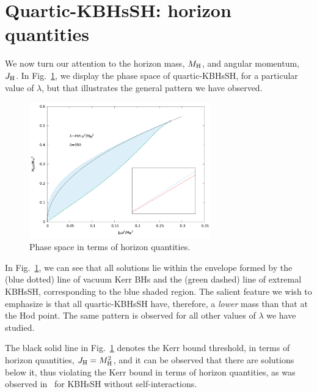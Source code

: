\section{Quartic-KBHsSH: horizon quantities}
\label{sec_IV}

 
We now turn our attention to the horizon mass, $M_{\rm H}$, and angular momentum, $J_{\rm H}$. In Fig.~\ref{horizon_phase}, we display the phase space of quartic-KBHsSH, for a particular value of $\lambda$, but that illustrates the general pattern we have observed. 


\begin{figure}[h!]
  \begin{center}
    \includegraphics[width=0.7\textwidth]{papers/selfInteractions/horizon-quantities.png}
      \end{center}
  \caption{Phase space in terms of horizon quantities.}
  \label{horizon_phase}
\end{figure}

In Fig.~\ref{horizon_phase}, we can see that all solutions lie within the envelope formed by the (blue dotted) line of vacuum Kerr BHs and the (green dashed) line of extremal KBHsSH, corresponding to the blue shaded region. The salient feature we wish to emphasize is that all quartic-KBHsSH have, therefore, a \textit{lower} mass than that at the Hod point. The same pattern is observed for all other values of $\lambda$ we have studied. 


The black solid line in Fig.~\ref{horizon_phase} denotes the Kerr bound threshold, in terms of horizon quantities, $J_{\rm H}=M_{\rm H}^2$, and it can be observed that there are solutions below it, thus violating the Kerr bound in terms of horizon quantities, as was observed in~\cite{Herdeiro:2015moa} for KBHsSH without self-interactions. 


